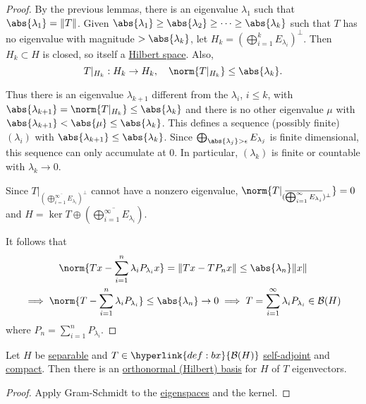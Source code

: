 \documentclass{article}
\begin{document}
\begin{proof}
    By the previous lemmas, there is an eigenvalue $\lambda_1$ such that $\abs{\lambda_1} = \|T\|$.
    Given $\abs{\lambda_1} \geq \abs{\lambda_2} \geq \dotsb \geq \abs{\lambda_k}$ such that $T$ has no eigenvalue with magnitude $> \abs{\lambda_k}$, let $H_k = \left(\bigoplus_{i=1}^k E_{\lambda_i}\right)^\perp$.
    Then $H_k \subset H$ is closed, so itself a \hyperlink{def:euclidean}{Hilbert space}.
    Also,
    \begin{equation*}
        T|_{H_k} : H_k \to H_k, \quad \norm{T|_{H_k}} \leq \abs{\lambda_k}.
    \end{equation*}

    Thus there is an eigenvalue $\lambda_{k + 1}$ different from the $\lambda_i$, $i \leq k$, with $\abs{\lambda_{k+1}} = \norm{T|_{H_k}} \leq \abs{\lambda_k}$ and there is no other eigenvalue $\mu$ with $\abs{\lambda_{k+1}} < \abs{\mu} \leq \abs{\lambda_k}$.
    This defines a sequence (possibly finite) $(\lambda_i)$ with $\abs{\lambda_{k+1}} \leq \abs{\lambda_k}$.
    Since
    $\bigoplus_{\abs{\lambda_j} > \epsilon} E_{\lambda_j}$ is finite dimensional, this sequence can only accumulate at 0.
    In particular, $(\lambda_k)$ is finite or countable with $\lambda_k \to 0$.

    Since $T|_{(\overline{\bigoplus_{i=1}^\infty E_{\lambda_i}})^\perp}$ cannot have a nonzero eigenvalue, $\norm{T|_{(\overline{\bigoplus_{i=1}^\infty E_{\lambda_i}})^\perp}} = 0$ and $H = \ker T \oplus (\overline{\bigoplus_{i=1}^\infty E_{\lambda_i}})$.

    It follows that
    \begin{gather*}
        \norm{T x - \sum_{i=1}^n \lambda_i P_{\lambda_i} x} = \|T x - T P_n x\| \leq \abs{\lambda_n} \|x\| \\
        \implies \norm{T - \sum_{i=1}^n \lambda_i P_{\lambda_i}} \leq \abs{\lambda_n} \to 0 \implies T = \sum_{i=1}^\infty \lambda_i P_{\lambda_i} \in \mathcal{B}(H)
    \end{gather*}
    where $P_n = \sum_{i=1}^n P_{\lambda_i}$.
\end{proof}

\begin{cor}
    Let $H$ be \hyperlink{def:separable}{separable} and $T \in \hyperlink{def:bx}{\mathcal{B}(H)}$ \hyperlink{def:normalMap}{self-adjoint} and \hyperlink{def:compact}{compact}.
    Then there is an \hyperlink{def:basis}{orthonormal (Hilbert) basis} for $H$ of $T$ eigenvectors.
\end{cor}
\begin{proof}
    Apply Gram-Schmidt to the \hyperlink{def:espace}{eigenspaces} and the kernel.
\end{proof}
\end{document}
